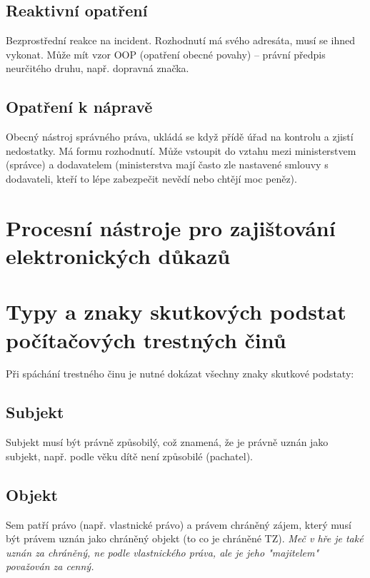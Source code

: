 \subsection*{Reaktivní opatření}
Bezprostřední reakce na incident. Rozhodnutí má svého adresáta, musí se ihned vykonat. Může mít vzor OOP (opatření obecné povahy) -- právní předpis neurčitého druhu, např. dopravná značka.

\subsection*{Opatření k nápravě}
Obecný nástroj správného práva, ukládá se když přídě úřad na kontrolu a zjistí nedostatky. Má formu rozhodnutí. Může vstoupit do vztahu mezi ministerstvem (správce) a dodavatelem (ministerstva mají často zle nastavené smlouvy s dodavateli, kteří to lépe zabezpečit nevědí nebo chtějí moc peněz).

\clearpage
\section{Procesní nástroje pro zajištování elektronických důkazů}

\clearpage
\section{Typy a znaky skutkových podstat počítačových trestných činů}
Při spáchání trestného činu je nutné dokázat všechny znaky skutkové podstaty:

\subsection*{Subjekt}
Subjekt musí být právně způsobilý, což znamená, že je právně uznán jako subjekt, např. podle věku dítě není způsobilé (pachatel).

\subsection*{Objekt}
Sem patří právo (např. vlastnické právo) a právem chráněný zájem, který musí být právem uznán jako chráněný objekt (to co je chráněné TZ). \textit{Meč v hře je také uznán za chráněný, ne podle vlastnického práva, ale je jeho "majitelem" považován za cenný.}

